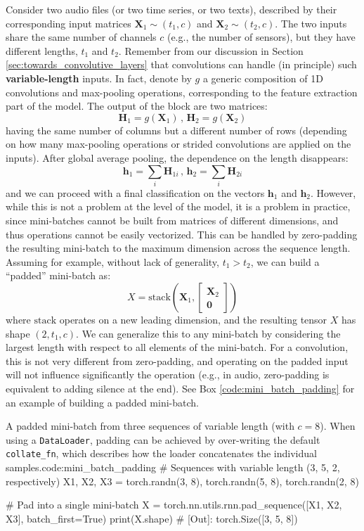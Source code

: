 Consider two audio files (or two time series, or two texts), described by their corresponding input matrices $\mathbf{X}_1 \sim (t_1, c)$ and $\mathbf{X}_2 \sim (t_2, c)$. The two inputs share the same number of channels $c$ (e.g., the number of sensors), but they have different lengths, $t_1$ and $t_2$. Remember from our discussion in Section \ref{sec:towards_convolutive_layers} that convolutions can handle (in principle) such \textbf{variable-length} inputs. In fact, denote by $g$ a generic composition of 1D convolutions and max-pooling operations, corresponding to the feature extraction part of the model. The output of the block are two matrices:
%
$$
\mathbf{H}_1=g(\mathbf{X}_1)\,,\,\mathbf{H}_2=g(\mathbf{X}_2)
$$
%
having the same number of columns but a different number of rows (depending on how many max-pooling operations or strided convolutions are applied on the inputs). After global average pooling, the dependence on the length disappears:
%
$$
\mathbf{h}_1=\sum_i\mathbf{H}_{1i} \,,\,\mathbf{h}_2=\sum_i\mathbf{H}_{2i}
$$
%
and we can proceed with a final classification on the vectors $\mathbf{h}_1$ and $\mathbf{h}_2$. However, while this is not a problem at the level of the model, it is a problem in practice, since mini-batches cannot be built from matrices of different dimensions, and thus operations cannot be easily vectorized. This can be handled by zero-padding the resulting mini-batch to the maximum dimension across the sequence length. Assuming for example, without lack of generality, $t_1 > t_2$, we can build a “padded” mini-batch as:
%
$$
X=\text{stack}\left(\mathbf{X}_1,\begin{bmatrix}\mathbf{X}_2\\ \mathbf{0}\end{bmatrix}\right)
$$
%
where $\text{stack}$ operates on a new leading dimension, and the resulting tensor $X$ has shape $(2, t_1,  c)$. We can generalize this to any mini-batch by considering the largest length with respect to all elements of the mini-batch. For a convolution, this is not very different from zero-padding, and operating on the padded input will not influence significantly the operation (e.g., in audio, zero-padding is equivalent to adding silence at the end).  See Box \ref{code:mini_batch_padding} for an example of building a padded mini-batch. 

\begin{mypy}{A padded mini-batch from three sequences of variable length (with $c=8$). When using a {\footnotesize\texttt{DataLoader}}, padding can be achieved by over-writing the default {\footnotesize\texttt{collate_fn}}, which describes how the loader concatenates the individual samples.}{code:mini_batch_padding}
# Sequences with variable length (3, 5, 2, respectively)
X1, X2, X3 = torch.randn(3, 8), 
             torch.randn(5, 8), 
             torch.randn(2, 8)

# Pad into a single mini-batch
X = torch.nn.utils.rnn.pad_sequence([X1, X2, X3], 
                    batch_first=True)
print(X.shape) # [Out]: torch.Size([3, 5, 8])
\end{mypy}

